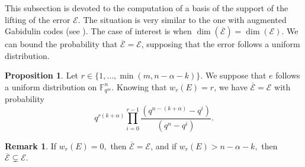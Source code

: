 \documentclass{article}
\newcommand{\Fqm}{\mathbb{F}_{q^m}}
\theoremstyle{definition}
\newtheorem{proposition}[theorem]{Proposition}
\newtheorem{remark}{Remark}
\begin{document}
This subsection is devoted to the computation of a basis of the support of
the lifting of the error $\mathcal{E}$. The situation is very similar to the one with augmented Gabidulin codes (see \cite{aragon_minrank_2025-1}). The case of interest is when $\dim \left( \overline{\mathcal{E}}
      \right) = \dim (\mathcal{E})$. We can bound the probability that
$\overline{\mathcal{E}} =\mathcal{E}$,  supposing that the error follows a uniform distribution. \color{black}

\begin{proposition} \label{proba}
      Let $r \in \{1, \dots, \min(m,n-\alpha-k)\}.$ We suppose that $e$ follows a uniform distribution on $\Fqm^n.$
      Knowing that $w_r(E)=r$, we have $\overline{\mathcal{E}} =\mathcal{E}$ with probability \[ q^{r(k+\alpha)} \prod_{i=0}^{r-1} \frac{(q^{n-(k+\alpha)}-q^i)}{(q^n -q^i)}.\]
\end{proposition}
\begin{remark}
      If $w_r(E)=0,$ then $\overline{\mathcal{E}} =\mathcal{E}$, and if $w_r(E)>n- \alpha-k,$ then $\overline{\mathcal{E}} \subsetneq \mathcal{E}.$
\end{remark}
\end{document}
